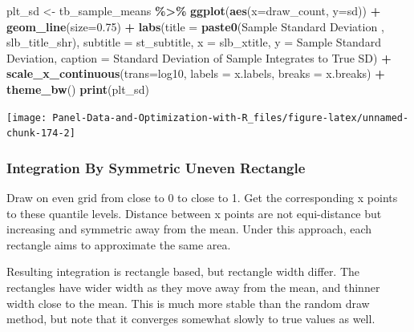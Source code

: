 \documentclass[
]{book}
\newenvironment{Shaded}{\begin{snugshade}}{\end{snugshade}}
\newcommand{\DataTypeTok}[1]{\textcolor[rgb]{0.13,0.29,0.53}{#1}}
\newcommand{\FloatTok}[1]{\textcolor[rgb]{0.00,0.00,0.81}{#1}}
\newcommand{\KeywordTok}[1]{\textcolor[rgb]{0.13,0.29,0.53}{\textbf{#1}}}
\newcommand{\NormalTok}[1]{#1}
\newcommand{\OperatorTok}[1]{\textcolor[rgb]{0.81,0.36,0.00}{\textbf{#1}}}
\newcommand{\StringTok}[1]{\textcolor[rgb]{0.31,0.60,0.02}{#1}}
\begin{document}
\begin{Shaded}
\begin{Highlighting}[]
\NormalTok{plt\_sd \textless{}{-}}\StringTok{ }\NormalTok{tb\_sample\_means }\OperatorTok{\%\textgreater{}\%}
\StringTok{  }\KeywordTok{ggplot}\NormalTok{(}\KeywordTok{aes}\NormalTok{(}\DataTypeTok{x=}\NormalTok{draw\_count, }\DataTypeTok{y=}\NormalTok{sd)) }\OperatorTok{+}
\StringTok{  }\KeywordTok{geom\_line}\NormalTok{(}\DataTypeTok{size=}\FloatTok{0.75}\NormalTok{) }\OperatorTok{+}
\StringTok{  }\KeywordTok{labs}\NormalTok{(}\DataTypeTok{title =} \KeywordTok{paste0}\NormalTok{(}\StringTok{\textquotesingle{}Sample Standard Deviation \textquotesingle{}}\NormalTok{, slb\_title\_shr),}
       \DataTypeTok{subtitle =}\NormalTok{ st\_subtitle,}
       \DataTypeTok{x =}\NormalTok{ slb\_xtitle,}
       \DataTypeTok{y =} \StringTok{\textquotesingle{}Sample Standard Deviation\textquotesingle{}}\NormalTok{,}
       \DataTypeTok{caption =} \StringTok{\textquotesingle{}Standard Deviation of Sample Integrates to True SD\textquotesingle{}}\NormalTok{) }\OperatorTok{+}
\StringTok{  }\KeywordTok{scale\_x\_continuous}\NormalTok{(}\DataTypeTok{trans=}\StringTok{\textquotesingle{}log10\textquotesingle{}}\NormalTok{, }\DataTypeTok{labels =}\NormalTok{ x.labels, }\DataTypeTok{breaks =}\NormalTok{ x.breaks) }\OperatorTok{+}
\StringTok{  }\KeywordTok{theme\_bw}\NormalTok{()}
\KeywordTok{print}\NormalTok{(plt\_sd)}
\end{Highlighting}
\end{Shaded}

\begin{center}\texttt{[image: Panel-Data-and-Optimization-with-R\_files/figure-latex/unnamed-chunk-174-2]} \end{center}

\hypertarget{integration-by-symmetric-uneven-rectangle}{%
\subsubsection{Integration By Symmetric Uneven Rectangle}\label{integration-by-symmetric-uneven-rectangle}}

Draw on even grid from close to 0 to close to 1. Get the corresponding x points to these quantile levels. Distance between x points are not equi-distance but increasing and symmetric away from the mean. Under this approach, each rectangle aims to approximate the same area.

Resulting integration is rectangle based, but rectangle width differ. The rectangles have wider width as they move away from the mean, and thinner width close to the mean. This is much more stable than the random draw method, but note that it converges somewhat slowly to true values as well.
\end{document}
